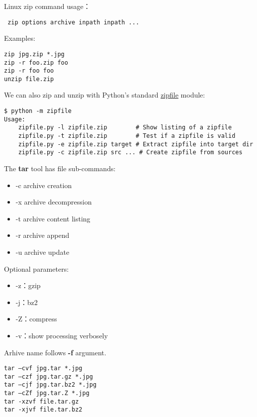 Linux zip command usage：
\begin{verbatim}
 zip options archive inpath inpath ...
\end{verbatim}

Examples:

\begin{verbatim}
zip jpg.zip *.jpg 
zip -r foo.zip foo
zip -r foo foo
unzip file.zip 
\end{verbatim}

We can also zip and unzip with Python's standard
\href{https://docs.python.org/2/library/zipfile.html}{zipfile} module:


\begin{verbatim}
$ python -m zipfile
Usage:
    zipfile.py -l zipfile.zip        # Show listing of a zipfile
    zipfile.py -t zipfile.zip        # Test if a zipfile is valid
    zipfile.py -e zipfile.zip target # Extract zipfile into target dir
    zipfile.py -c zipfile.zip src ... # Create zipfile from sources
\end{verbatim}


The \textbf{tar} tool has file sub-commands:
\begin{itemize}
  \item -c archive creation 
  \item -x archive decompression
  \item -t archive content listing
  \item -r archive append
  \item -u archive update
\end{itemize}

Optional parameters:
\begin{itemize}
    \item -z：gzip
    \item -j：bz2
    \item -Z：compress
    \item -v：show processing verbosely
\end{itemize}

Arhive name follows \textbf{-f} argument.

\begin{verbatim}
tar –cvf jpg.tar *.jpg 
tar –czf jpg.tar.gz *.jpg   
tar –cjf jpg.tar.bz2 *.jpg 
tar –cZf jpg.tar.Z *.jpg 
tar -xzvf file.tar.gz 
tar -xjvf file.tar.bz2 
\end{verbatim}




